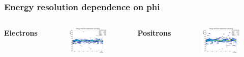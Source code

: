 \documentclass{beamer}
\begin{document}
		\begin{frame}
			\frametitle{Energy resolution dependence on phi}
			\begin{columns}
				\centering
				\Large \textbf{Electrons}
				\begin{figure}
					\centering
					\includegraphics[width = 0.95 \linewidth]{../images/c_e_deltaenergy_phi.png}
				\end{figure}
				\centering
				\Large \textbf{Positrons}
				\begin{figure}
					\centering
					\includegraphics[width = 0.95 \linewidth]{../images/c_p_deltaenergy_phi.png}
				\end{figure}
			\end{columns}
		\end{frame}
\end{document}
